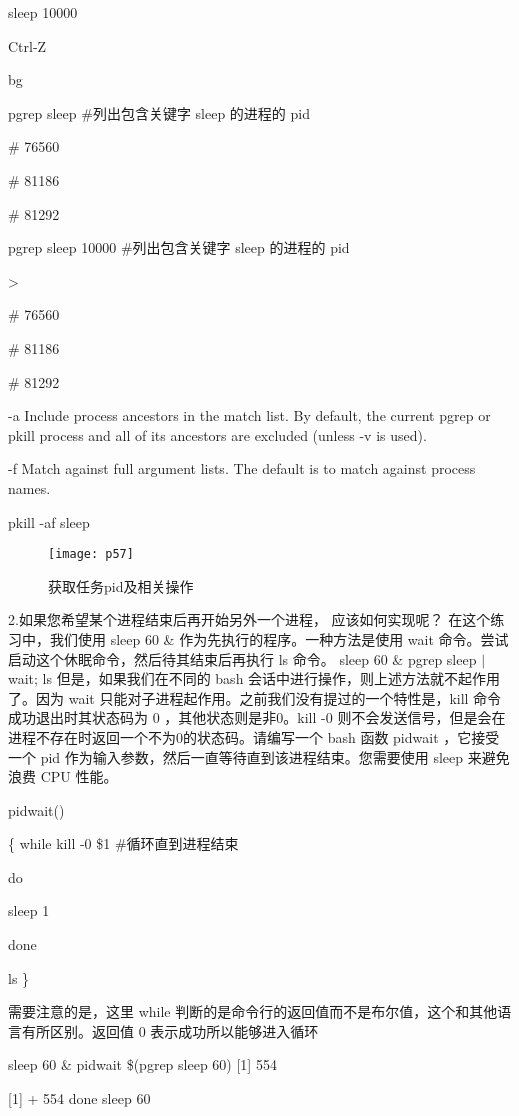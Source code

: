 \documentclass[a4paper ,12pt]{article}
\begin{document}
	sleep 10000
	
	Ctrl-Z
	
	bg
	
	pgrep sleep \#列出包含关键字 sleep 的进程的 pid
	
    
	
	\# 76560
	
	\# 81186
	
	\# 81292
	
	pgrep sleep 10000 \#列出包含关键字 sleep 的进程的 pid
	
	>
	
	\# 76560
	
	\# 81186
	
	\# 81292
	
	-a  Include process ancestors in the match list.  By default, the current pgrep or pkill process and all of its ancestors are excluded (unless -v is used).
	
	-f  Match against full argument lists. The default is to match against process names.
	
	pkill  -af sleep
	\begin{figure}[h]
		\centering
		\texttt{[image: p57]}
		\caption{获取任务pid及相关操作}
	\end{figure}
	
	2.如果您希望某个进程结束后再开始另外一个进程， 应该如何实现呢？ 在这个练习中，我们使用 sleep 60 \& 作为先执行的程序。一种方法是使用 wait 命令。尝试启动这个休眠命令，然后待其结束后再执行 ls 命令。
	sleep 60 \&
	pgrep sleep $|$ wait; ls
	但是，如果我们在不同的 bash 会话中进行操作，则上述方法就不起作用了。因为 wait 只能对子进程起作用。之前我们没有提过的一个特性是，kill 命令成功退出时其状态码为 0 ，其他状态则是非0。kill -0 则不会发送信号，但是会在进程不存在时返回一个不为0的状态码。请编写一个 bash 函数 pidwait ，它接受一个 pid 作为输入参数，然后一直等待直到该进程结束。您需要使用 sleep 来避免浪费 CPU 性能。
	
	pidwait()
	
	\{
		while kill -0 \$1 \#循环直到进程结束
		
		do
		
		sleep 1 
		
		done
		
		ls
	\}
	
	需要注意的是，这里 while 判断的是命令行的返回值而不是布尔值，这个和其他语言有所区别。返回值 0 表示成功所以能够进入循环
	
	sleep 60 \& pidwait \$(pgrep sleep 60)
	[1] 554
	
	[1]  + 554 done       sleep 60
	
\end{document}
